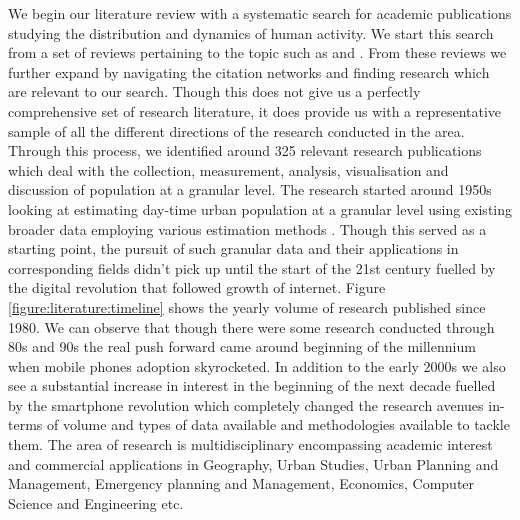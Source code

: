We begin our literature review with a systematic search for academic publications studying the distribution and dynamics of human activity.
We start this search from a set of reviews pertaining to the topic such as \citet{ratti2006, jiang2013, steenbruggen2013, arribas-bel2014} and \citet{li2016}.
From these reviews we further expand by navigating the citation networks and finding research which are relevant to our search.
Though this does not give us a perfectly comprehensive set of research literature, it does provide us with a representative sample of all the different directions of the research conducted in the area.
Through this process, we identified around 325 relevant research publications which deal with the collection, measurement, analysis, visualisation and discussion of population at a granular level.
The research started around 1950s looking at estimating day-time urban population at a granular level using existing  broader data employing various estimation methods \cite{foley1954, schmitt1956}.
Though this served as a starting point, the pursuit of such granular data and their applications in corresponding fields didn't pick up until the start of the 21st century fuelled by the digital revolution that followed growth of internet.
Figure \ref{figure:literature:timeline} shows the yearly volume of research published since 1980.
We can observe that though there were some research conducted through 80s and 90s the real push forward came around beginning of the millennium when mobile phones adoption skyrocketed.
In addition to the early 2000s we also see a substantial increase in interest in the beginning of the next decade fuelled by the smartphone revolution which completely changed the research avenues in-terms of volume and types of data available and methodologies available to tackle them.
The area of research is multidisciplinary encompassing academic interest and commercial applications in Geography, Urban Studies, Urban Planning and Management, Emergency planning and Management, Economics, Computer Science and Engineering etc.







